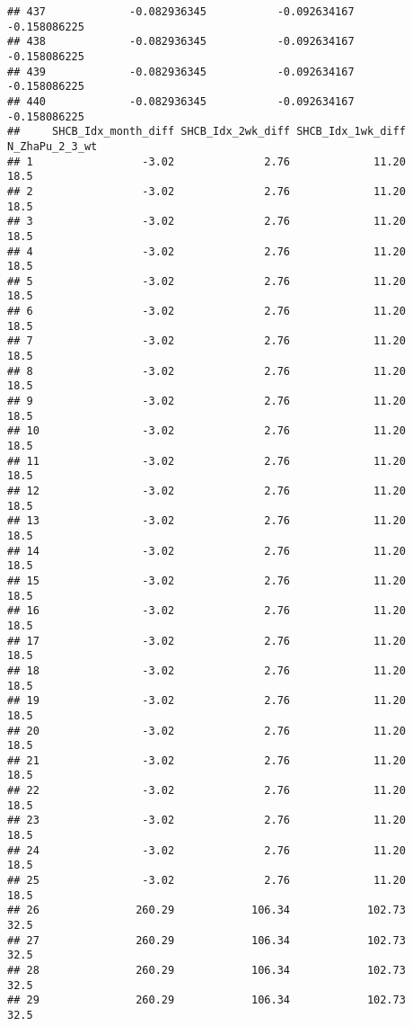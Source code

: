 \documentclass[]{article}
\begin{document}
\begin{verbatim}
## 437             -0.082936345           -0.092634167           -0.158086225
## 438             -0.082936345           -0.092634167           -0.158086225
## 439             -0.082936345           -0.092634167           -0.158086225
## 440             -0.082936345           -0.092634167           -0.158086225
##     SHCB_Idx_month_diff SHCB_Idx_2wk_diff SHCB_Idx_1wk_diff N_ZhaPu_2_3_wt
## 1                 -3.02              2.76             11.20           18.5
## 2                 -3.02              2.76             11.20           18.5
## 3                 -3.02              2.76             11.20           18.5
## 4                 -3.02              2.76             11.20           18.5
## 5                 -3.02              2.76             11.20           18.5
## 6                 -3.02              2.76             11.20           18.5
## 7                 -3.02              2.76             11.20           18.5
## 8                 -3.02              2.76             11.20           18.5
## 9                 -3.02              2.76             11.20           18.5
## 10                -3.02              2.76             11.20           18.5
## 11                -3.02              2.76             11.20           18.5
## 12                -3.02              2.76             11.20           18.5
## 13                -3.02              2.76             11.20           18.5
## 14                -3.02              2.76             11.20           18.5
## 15                -3.02              2.76             11.20           18.5
## 16                -3.02              2.76             11.20           18.5
## 17                -3.02              2.76             11.20           18.5
## 18                -3.02              2.76             11.20           18.5
## 19                -3.02              2.76             11.20           18.5
## 20                -3.02              2.76             11.20           18.5
## 21                -3.02              2.76             11.20           18.5
## 22                -3.02              2.76             11.20           18.5
## 23                -3.02              2.76             11.20           18.5
## 24                -3.02              2.76             11.20           18.5
## 25                -3.02              2.76             11.20           18.5
## 26               260.29            106.34            102.73           32.5
## 27               260.29            106.34            102.73           32.5
## 28               260.29            106.34            102.73           32.5
## 29               260.29            106.34            102.73           32.5

\end{verbatim}
\end{document}
